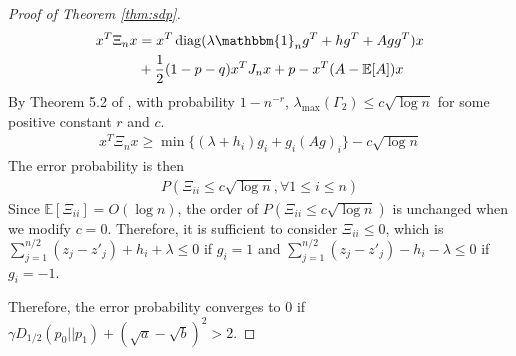\documentclass[conference]{IEEEtran}
\DeclareMathOperator{\diag}{diag}
\begin{document}
\begin{proof}[Proof of Theorem \ref{thm:sdp}]
\begin{align*}
		x^T \Xi_n x &= x^T \diag( \lambda \mathbbm{1}_ng^T+hg^T + Agg^T) x  \\
		&+ \frac{1}{2}(1-p-q)x^TJ_n x
		 + p -x^T(A-\mathbb{E}[A])x
		\end{align*}
		By Theorem 5.2 of \cite{lei2015consistency},
		with probability $1-n^{-r}$, $\lambda_{\max}(\Gamma_2) \leq c\sqrt{\log n}$ for some positive constant $r$ and $c$.
		\begin{align*}
		x^T \Xi_n x \geq \min\{(\lambda + h_i) g_i + g_i (Ag)_i \} - c \sqrt{\log n}
		\end{align*}
		The error probability is then
		\begin{align*}
		P(\Xi_{ii} \leq c\sqrt{\log n}, \forall 1\leq i \leq n)
		\end{align*}
		Since $\mathbb{E}[\Xi_{ii}]=O(\log n)$, the order of $P(\Xi_{ii} \leq c\sqrt{\log n})$ is unchanged when we modify $c=0$. Therefore, it is sufficient to consider $\Xi_{ii} \leq 0 $, which is
		$\sum_{j=1}^{n/2} (z_j - z'_j) + h_i + \lambda \leq 0$ if $g_i=1$ and
		$\sum_{j=1}^{n/2} (z_j - z'_j) - h_i - \lambda \leq 0$ if $g_i = -1$.
	
		Therefore, the error probability converges to 0
		if $\gamma D_{1/2}(p_0||p_1) + (\sqrt{a} - \sqrt{b})^2 > 2$.
		
	\end{proof}
	
	
	
\end{document}
